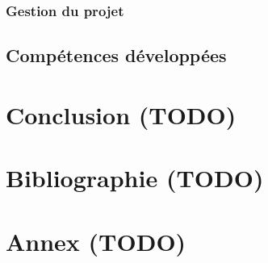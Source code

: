 \documentclass[11pt]{article}
\begin{document}
\subsubsection{Gestion du projet}
\label{sec:orge4121fe}
\subsection{Compétences développées}
\label{sec:orgaffddf4}

\section{Conclusion (TODO)}
\label{sec:org8c8904e}
\section{Bibliographie (TODO)}
\label{sec:org6e3f752}
\section{Annex (TODO)}
\label{sec:org7fa85e3}
\end{document}
